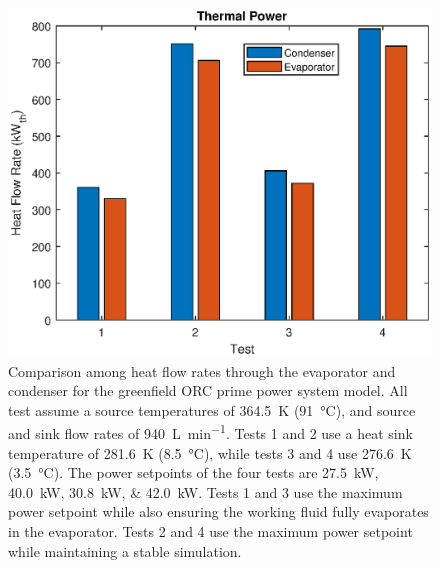 \begin{figure}[p]
	\centering

	\includegraphics[width=\textwidth]{figures/gfHeat}

	\caption{Comparison among heat flow rates through the evaporator and condenser for the greenfield ORC prime power system model. All test assume a source temperatures of \SI{364.5}{\kelvin} (\SI{91}{\degreeCelsius}), and source and sink flow rates of \SI{940}{\liter\per\minute}. Tests 1 and 2 use a heat sink temperature of \SI{281.6}{\kelvin} (\SI{8.5}{\degreeCelsius}), while tests 3 and 4 use \SI{276.6}{\kelvin} (\SI{3.5}{\degreeCelsius}). The power setpoints of the four tests are \SIlist{27.5;40.0;30.8;42.0}{\kilo\watt}. Tests 1 and 3 use the maximum power setpoint while also ensuring the working fluid fully evaporates in the evaporator. Tests 2 and 4 use the maximum power setpoint while maintaining a stable simulation. }
	\label{fig:gfHeat}
\end{figure}